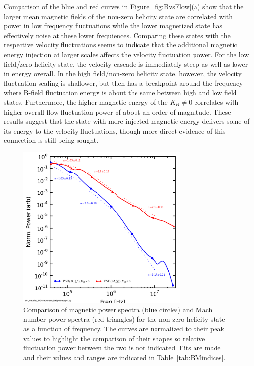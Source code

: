 \documentclass[aip,prl,amsmath,amssymb,reprint,superscriptaddress]{revtex4-1} %
\begin{document}
Comparison of the blue and red curves in Figure~\ref{fig:BvsFlow}(a) show that the larger mean magnetic fields of the non-zero helicity state are correlated with power in low frequency fluctuations while the lower magnetized state has effectively noise at these lower frequiences. Comparing these states with the respective velocity fluctuations seems to indicate that the additional magnetic energy injection at larger scales affects the velocity fluctuation power. For the low field/zero-helicity state, the velocity cascade is immediately steep as well as lower in energy overall. In the high field/non-zero helicity state, however, the velocity fluctuation scaling is shallower, but then has a breakpoint around the frequency where B-field fluctuation energy is about the same between high and low field states. Furthermore, the higher magnetic energy of the $K_{B}\neq 0$ correlates with higher overall flow fluctuation power of about an order of magnitude. These results suggest that the state with more injected magnetic energy delivers some of its energy to the velocity fluctuations, though more direct evidence of this connection is still being sought.

\begin{figure}[!htbp]
\centerline{
\includegraphics[width=8.5cm]{BvsFlowspec_wFits_40t60us}}
\caption{\label{fig:BvsFlow_wFits} Comparison of magnetic power spectra (blue circles) and Mach number power spectra (red triangles) for the non-zero helicity state as a function of frequency. The curves are normalized to their peak values to highlight the comparison of their shapes so relative fluctuation power between the two is not indicated. Fits are made and their values and ranges are indicated in Table~\ref{tab:BMindices}.}
\end{figure}
\end{document}
